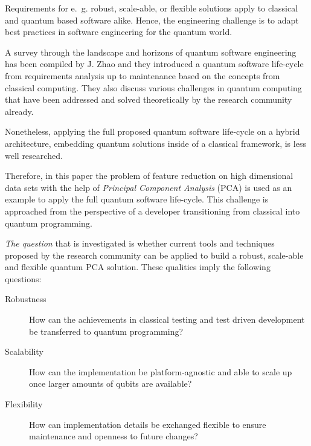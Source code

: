 
Requirements for e.~g. robust, scale-able, or flexible solutions apply to classical and quantum based software alike. Hence, the engineering challenge is to adapt best practices in software engineering for the quantum world.

A survey through the landscape and horizons of quantum software engineering has been compiled by J. Zhao \cite{Zhao_2020} and they introduced a quantum software life-cycle from requirements analysis up to maintenance based on the concepts from classical computing. They also discuss various challenges in quantum computing that have been addressed and solved theoretically by the research community already.

Nonetheless, applying the full proposed quantum software life-cycle on a hybrid architecture, embedding quantum solutions inside of a classical framework, is less well researched.

Therefore, in this paper the problem of feature reduction on high dimensional data sets with the help of \emph{Principal Component Analysis} (PCA) is used as an example to apply the full quantum software life-cycle. This challenge is approached from the perspective of a developer transitioning from classical into quantum programming.

\emph{The question} that is investigated is whether current tools and techniques proposed by the research community can be applied to build a robust, scale-able and flexible quantum PCA solution. These qualities imply the following questions:
\begin{description}
  \item [Robustness] How can the achievements in classical testing and test driven development be transferred to quantum programming?
  \item [Scalability] How can the implementation be platform-agnostic and able to scale up once larger amounts of qubits are available?
  \item [Flexibility] How can implementation details be exchanged flexible to ensure maintenance and openness to future changes?
\end{description}

